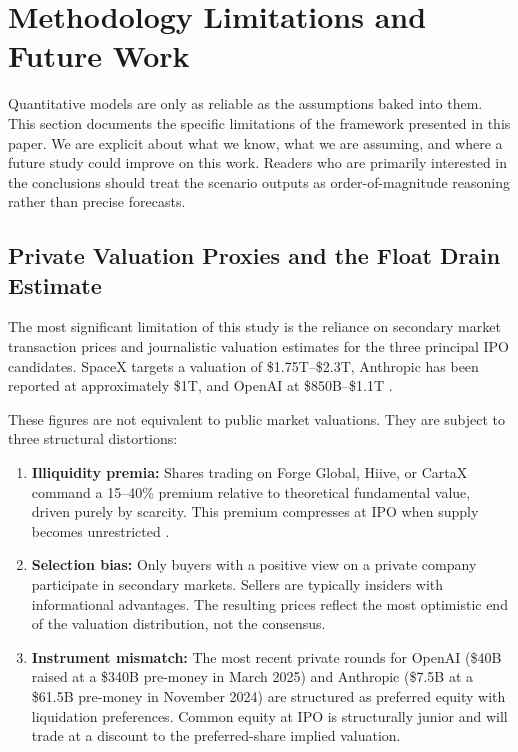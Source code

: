 
\section{Methodology Limitations and Future Work}
\label{sec:limitations}

Quantitative models are only as reliable as the assumptions baked into them. This section
documents the specific limitations of the framework presented in this paper. We are
explicit about what we know, what we are assuming, and where a future study could
improve on this work. Readers who are primarily interested in the conclusions should
treat the scenario outputs as order-of-magnitude reasoning rather than precise forecasts.

\subsection{Private Valuation Proxies and the Float Drain Estimate}

The most significant limitation of this study is the reliance on secondary market
transaction prices and journalistic valuation estimates for the three principal IPO
candidates. SpaceX targets a valuation of \$1.75T--\$2.3T, Anthropic has been
reported at approximately \$1T, and OpenAI at \$850B--\$1.1T
\citep{bloomberg_spacex_2026,wsj_anthropic_ipo,ft_openai_ipo}.

These figures are not equivalent to public market valuations. They are subject to
three structural distortions:

\begin{enumerate}
  \item \textbf{Illiquidity premia:} Shares trading on Forge Global, Hiive, or CartaX
        command a 15--40\% premium relative to theoretical fundamental value, driven
        purely by scarcity. This premium compresses at IPO when supply becomes
        unrestricted \citep{bessembinder2020}.
  \item \textbf{Selection bias:} Only buyers with a positive view on a private company
        participate in secondary markets. Sellers are typically insiders with informational
        advantages. The resulting prices reflect the most optimistic end of the valuation
        distribution, not the consensus.
  \item \textbf{Instrument mismatch:} The most recent private rounds for OpenAI
        (\$40B raised at a \$340B pre-money in March 2025) and Anthropic (\$7.5B at a
        \$61.5B pre-money in November 2024) are structured as preferred equity with
        liquidation preferences. Common equity at IPO is structurally junior and will
        trade at a discount to the preferred-share implied valuation.
\end{enumerate}


